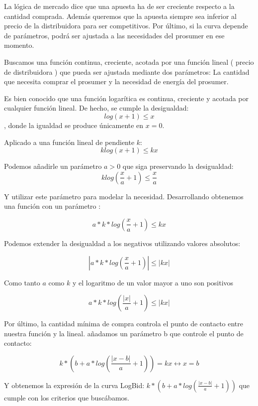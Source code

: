 \documentclass[12pt,a4paper,openright,oneside]{article}
\newcommand\abs[1]{\left|#1\right|}
\numberwithin{equation}{section}
\theoremstyle{definition}
\begin{document}
La lógica de mercado dice que una apuesta ha de ser creciente respecto a la cantidad comprada. Además queremos que la apuesta siempre sea inferior al precio de la distribuidora para ser competitivos. Por último, si la curva depende de parámetros, podrá ser ajustada a las necesidades del prosumer en ese momento.

Buscamos una función continua, creciente, acotada por una función lineal ( precio de distribuidora ) que pueda ser ajustada mediante dos parámetros: La cantidad que necesita comprar el prosumer y la necesidad de energía del prosumer.

Es bien conocido que una función logarítica es continua, creciente y acotada por cualquier función lineal. De hecho, se cumple la desigualdad: $$log(x+1) \leq x$$, donde la igualdad se produce únicamente en $x=0$. 

Aplicado a una función lineal de pendiente $k$: $$klog(x+1) \leq kx$$

Podemos añadirle un parámetro $a > 0$ que siga preservando la desigualdad: $$klog(\frac{x}{a}+1) \leq \frac{x}{a}$$

Y utilizar este parámetro para modelar la necesidad. Desarrollando obtenemos una función con un parámetro :

$$a*k*log(\frac{x}{a}+1) \leq kx$$

Podemos extender la desigualdad a los negativos utilizando valores absolutos:

$$\abs{a*k*log(\frac{x}{a}+1)} \leq \abs{kx}$$

Como tanto $a$ como $k$ y el logaritmo de un valor mayor a uno son positivos

$$a*k*log(\frac{\abs{x}}{a}+1) \leq \abs{kx}$$

Por último, la cantidad mínima de compra controla el punto de contacto entre nuestra función y la lineal. añadamos un parámetro b que controle el punto de contacto:

$$k*(b + a*log(\frac{\abs{x - b}}{a}+1)) = kx \leftrightarrow x = b $$

Y obtenemos la expresión de la curva LogBid: $k*(b + a*log(\frac{\abs{x - b}}{a}+1))$ que cumple con los criterios que buscábamos.
\end{document}
